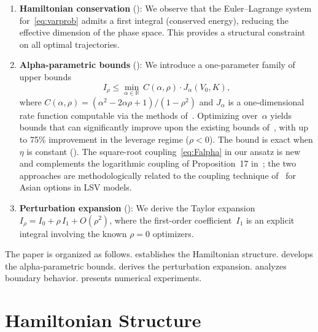 \documentclass[12pt]{article}
\newcommand{\R}{\mathbb{R}}
\begin{document}
\begin{enumerate}
\item \textbf{Hamiltonian conservation} ():
  We observe that the Euler--Lagrange system for~\eqref{eq:varprob} admits a first integral
  (conserved energy), reducing the effective dimension of the phase space. This provides
  a structural constraint on all optimal trajectories.

\item \textbf{Alpha-parametric bounds} ():
  We introduce a one-parameter family of upper bounds
  \[
  I_\rho \leq \min_{\alpha\in\R}\, C(\alpha,\rho)\cdot J_\alpha(V_0,K),
  \]
  where $C(\alpha,\rho) = (\alpha^2-2\alpha\rho+1)/(1-\rho^2)$ and $J_\alpha$ is a
  one-dimensional rate function computable via the methods of~\cite{PZ2023}.
  Optimizing over~$\alpha$ yields bounds that can significantly improve upon the existing
  bounds of~\cite{PWZ2025}, with up to 75\% improvement in the leverage regime
  ($\rho<0$). The bound is exact when $\eta$ is constant ().
  The square-root coupling~\eqref{eq:Falpha} in our ansatz is new and complements the
  logarithmic coupling of Proposition~17 in~\cite{PWZ2025}; the two approaches are
  methodologically related to the coupling technique of~\cite{PZ2024} for Asian options
  in LSV models.

\item \textbf{Perturbation expansion} ():
  We derive the Taylor expansion $I_\rho = I_0 + \rho\,I_1 + O(\rho^2)$, where the
  first-order coefficient~$I_1$ is an explicit integral involving the known $\rho=0$
  optimizers.
\end{enumerate}

The paper is organized as follows.  establishes the Hamiltonian
structure.  develops the alpha-parametric bounds.
 derives the perturbation expansion. 
analyzes boundary behavior.  presents numerical experiments.


\section{Hamiltonian Structure}\label{sec:hamiltonian}
\end{document}
